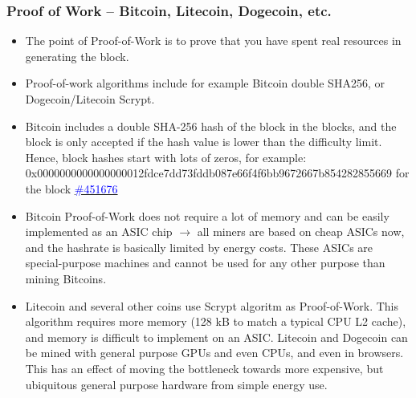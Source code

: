\documentclass[8pt]{beamer}
\begin{document}
\begin{frame}
\frametitle{Proof of Work – Bitcoin, Litecoin, Dogecoin, etc.}

\begin{itemize}
 \item The point of Proof-of-Work is to prove that you have spent real resources in generating the block.
 \item Proof-of-work algorithms include for example Bitcoin double SHA256, or Dogecoin/Litecoin Scrypt.
 \item Bitcoin includes a double SHA-256 hash of the block in the blocks, and the block is only accepted if the hash value is lower than the difficulty limit. Hence, block hashes start with lots of zeros, for example:
       0x0000000000000000012fdce7dd73fddb087e66f4f6bb9672667b854282855669 for the block 
       \href{https://blockexplorer.com/block/0000000000000000012fdce7dd73fddb087e66f4f6bb9672667b854282855669}{\textcolor{blue}{\#451676}}
 \item Bitcoin Proof-of-Work does not require a lot of memory and can be easily implemented as an ASIC chip $ \rightarrow $ all miners are based on cheap ASICs now, and the hashrate is basically limited by energy costs.
       These ASICs are special-purpose machines and cannot be used for any other purpose than mining Bitcoins.
 \item Litecoin and several other coins use Scrypt algoritm as Proof-of-Work. This algorithm requires more memory (128 kB to match a typical CPU L2 cache), and memory is difficult to implement on an ASIC.
       Litecoin and Dogecoin can be mined with general purpose GPUs and even CPUs, and even in browsers. This has an effect of moving the bottleneck towards more expensive, but ubiquitous general purpose hardware
       from simple energy use.
\end{itemize}
\end{frame}
\end{document}

